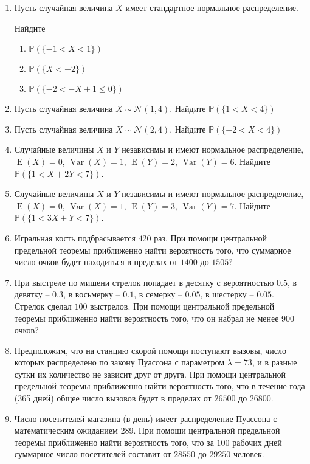\documentclass[12pt]{article}
\DeclareMathOperator{\Var}{Var}
\DeclareMathOperator{\E}{E}
\def \cN{\mathcal{N}}
\def \P{\mathbb{P}}
\begin{document}
\begin{enumerate}
\item Пусть случайная величина $X$ имеет стандартное нормальное распределение.

Найдите
\begin{enumerate}
\item $\P(\{-1 < X < 1\})$
\item $\P(\{X < -2\})$
\item $\P(\{-2 < -X + 1 \leq 0\})$
\end{enumerate}

\item Пусть случайная величина $X \sim \cN(1,4)$. Найдите $\P(\{1<X<4\})$

\item Пусть случайная величина $X \sim \cN(2,4)$. Найдите $\P(\{-2<X<4\})$

\item Случайные величины $X$ и $Y$ независимы и  имеют нормальное распределение, $\E(X) = 0 $, $\Var(X) = 1$, $\E(Y) = 2$, $\Var(Y) = 6$. Найдите $\P(\{1 < X + 2Y < 7\})$.

\item Случайные величины $X$ и $Y$ независимы и  имеют нормальное распределение, $\E(X) = 0 $, $\Var(X) = 1$, $\E(Y) = 3$, $\Var(Y) = 7$. Найдите $\P(\{1 < 3X + Y < 7\})$.

\item Игральная кость подбрасывается $420$ раз. При помощи центральной предельной теоремы приближенно найти вероятность того, что суммарное число очков будет находиться в пределах от $1400$ до $1505$?

\item При выстреле по мишени стрелок попадает в десятку с вероятностью $0.5$, в девятку – $0.3$, в восьмерку – $0.1$, в семерку – $0.05$, в шестерку – $0.05$.
Стрелок сделал $100$ выстрелов. При помощи центральной предельной теоремы приближенно найти вероятность того, что он набрал не менее 900 очков?

\item Предположим, что на станцию скорой помощи поступают вызовы, число которых распределено по закону Пуассона с параметром $\lambda = 73$, и в разные сутки их количество не зависит друг от друга. При помощи центральной предельной теоремы приближенно найти вероятность того, что в течение года (365 дней) общее число вызовов будет в пределах от $26500$ до $26800$.

\item Число посетителей магазина (в день) имеет распределение Пуассона с математическим ожиданием $289$. При помощи центральной предельной теоремы приближенно найти вероятность того, что за $100$ рабочих дней суммарное число посетителей составит от $28550$ до $29250$ человек.


\end{enumerate}
\end{document}
